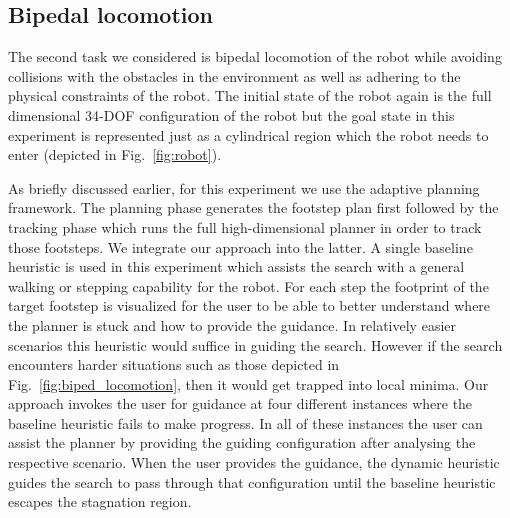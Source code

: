 \documentclass{article}
\begin{document}




\subsection{Bipedal locomotion}
\label{subsec:locomotion}
The second task we considered is bipedal locomotion of the robot while avoiding collisions with the obstacles in the environment as well as adhering to the physical constraints of the robot. The initial state of the robot again is the full dimensional 34-DOF configuration of the robot but the goal state in this experiment is represented just as a cylindrical region which the robot needs to enter (depicted in Fig.~\ref{fig:robot}).

As briefly discussed earlier, for this experiment we use the adaptive planning framework. The planning phase generates the footstep plan first followed by the tracking phase which runs the full high-dimensional planner in order to track those footsteps. We integrate our approach into the latter. A single baseline heuristic is used in this experiment which assists the search with a general walking or stepping capability for the robot. For each step the footprint of the target footstep is visualized for the user to be able to better understand where the planner is stuck and how to provide the guidance. In relatively easier scenarios this heuristic would suffice in guiding the search. However if the search encounters harder situations such as those depicted in Fig.~\ref{fig:biped_locomotion}, then it would get trapped into local minima. Our approach invokes the user for guidance at four different instances where the baseline heuristic fails to make progress. In all of these instances the user can assist the planner by providing the guiding configuration after analysing the respective scenario. When the user provides the guidance, the dynamic heuristic guides the search to pass through that configuration until the baseline heuristic escapes the stagnation region.
\end{document}
